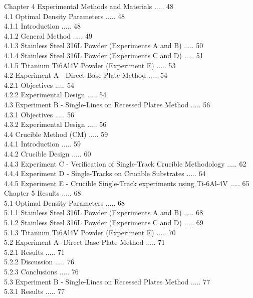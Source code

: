 \documentclass[10pt]{article}
\begin{document}
Chapter 4 Experimental Methods and Materials ..... 48\\
4.1 Optimal Density Parameters ..... 48\\
4.1.1 Introduction ..... 48\\
4.1.2 General Method ..... 49\\
4.1.3 Stainless Steel 316L Powder (Experiments A and B) ..... 50\\
4.1.4 Stainless Steel 316L Powder (Experiments C and D) ..... 51\\
4.1.5 Titanium Ti6Al4V Powder (Experiment E) ..... 53\\
4.2 Experiment A - Direct Base Plate Method ..... 54\\
4.2.1 Objectives ..... 54\\
4.2.2 Experimental Design ..... 54\\
4.3 Experiment B - Single-Lines on Recessed Plates Method ..... 56\\
4.3.1 Objectives ..... 56\\
4.3.2 Experimental Design ..... 56\\
4.4 Crucible Method (CM) ..... 59\\
4.4.1 Introduction ..... 59\\
4.4.2 Crucible Design ..... 60\\
4.4.3 Experiment C - Verification of Single-Track Crucible Methodology ..... 62\\
4.4.4 Experiment D - Single-Tracks on Crucible Substrates ..... 64\\
4.4.5 Experiment E - Crucible Single-Track experiments using Ti-6Al-4V ..... 65\\
Chapter 5 Results ..... 68\\
5.1 Optimal Density Parameters ..... 68\\
5.1.1 Stainless Steel 316L Powder (Experiments A and B) ..... 68\\
5.1.2 Stainless Steel 316L Powder (Experiments C and D) ..... 69\\
5.1.3 Titanium Ti6Al4V Powder (Experiment E) ..... 70\\
5.2 Experiment A- Direct Base Plate Method ..... 71\\
5.2.1 Results ..... 71\\
5.2.2 Discussion ..... 76\\
5.2.3 Conclusions ..... 76\\
5.3 Experiment B - Single-Lines on Recessed Plates Method ..... 77\\
5.3.1 Results ..... 77\\
\end{document}
